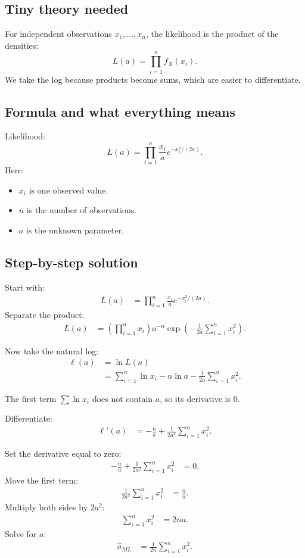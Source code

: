 \documentclass[11pt,a4paper]{article}
\begin{document}
\subsection*{Tiny theory needed}
For independent observations \(x_1,\ldots,x_n\), the likelihood is the product of the densities:
\[
L(a)=\prod_{i=1}^n f_X(x_i).
\]
We take the log because products become sums, which are easier to differentiate.

\subsection*{Formula and what everything means}
Likelihood:
\[
L(a)=\prod_{i=1}^n \frac{x_i}{a}e^{-x_i^2/(2a)}.
\]
Here:
\begin{itemize}[leftmargin=*]
    \item \(x_i\) is one observed value.
    \item \(n\) is the number of observations.
    \item \(a\) is the unknown parameter.
\end{itemize}

\subsection*{Step-by-step solution}
Start with:
\begin{align*}
L(a)
&=\prod_{i=1}^n \frac{x_i}{a}e^{-x_i^2/(2a)}.
\end{align*}
Separate the product:
\begin{align*}
L(a)
&=\left(\prod_{i=1}^n x_i\right)a^{-n}
\exp\left(-\frac{1}{2a}\sum_{i=1}^n x_i^2\right).
\end{align*}

Now take the natural log:
\begin{align*}
\ell(a)
&=\ln L(a)\\
&=\sum_{i=1}^n \ln x_i - n\ln a-\frac{1}{2a}\sum_{i=1}^n x_i^2.
\end{align*}

The first term \(\sum \ln x_i\) does not contain \(a\), so its derivative is 0.

Differentiate:
\begin{align*}
\ell'(a)
&=-\frac{n}{a}+\frac{1}{2a^2}\sum_{i=1}^n x_i^2.
\end{align*}

Set the derivative equal to zero:
\begin{align*}
-\frac{n}{a}+\frac{1}{2a^2}\sum_{i=1}^n x_i^2&=0.
\end{align*}
Move the first term:
\begin{align*}
\frac{1}{2a^2}\sum_{i=1}^n x_i^2&=\frac{n}{a}.
\end{align*}
Multiply both sides by \(2a^2\):
\begin{align*}
\sum_{i=1}^n x_i^2&=2na.
\end{align*}
Solve for \(a\):
\begin{align*}
\hat a_{ML}
&=\frac{1}{2n}\sum_{i=1}^n x_i^2.
\end{align*}
\end{document}
